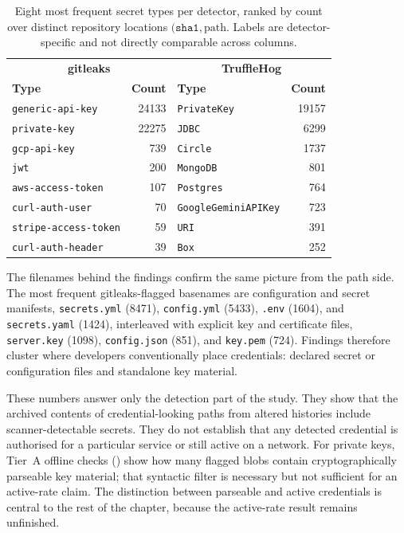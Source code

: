 \begin{table}[b]
\centering
\caption{Eight most frequent secret types per detector, ranked by count over distinct repository locations \((\texttt{sha1}, \text{path}\). Labels are detector-specific and not directly comparable across columns.}
\label{tab:sec-secret-types}
\small
\begin{tabular}{lr@{\hskip 1.5cm}lr}
\hline
\multicolumn{2}{c}{\textbf{gitleaks}} & \multicolumn{2}{c}{\textbf{TruffleHog}} \\
\textbf{Type} & \textbf{Count} & \textbf{Type} & \textbf{Count} \\
\hline
\texttt{generic-api-key}     & \num{24133} & \texttt{PrivateKey}         & \num{19157} \\
\texttt{private-key}         & \num{22275} & \texttt{JDBC}               & \num{6299}  \\
\texttt{gcp-api-key}         & \num{739}   & \texttt{Circle}             & \num{1737}  \\
\texttt{jwt}                 & \num{200}   & \texttt{MongoDB}            & \num{801}   \\
\texttt{aws-access-token}    & \num{107}   & \texttt{Postgres}           & \num{764}   \\
\texttt{curl-auth-user}      & \num{70}    & \texttt{GoogleGeminiAPIKey} & \num{723}   \\
\texttt{stripe-access-token} & \num{59}    & \texttt{URI}                & \num{391}   \\
\texttt{curl-auth-header}    & \num{39}    & \texttt{Box}                & \num{252}   \\
\hline
\end{tabular}
\end{table}

The filenames behind the findings confirm the same picture from the path side.
The most frequent gitleaks-flagged basenames are configuration and secret manifests, \texttt{secrets.yml} (\num{8471}), \texttt{config.yml} (\num{5433}), \texttt{.env} (\num{1604}), and \texttt{secrets.yaml} (\num{1424}), interleaved with explicit key and certificate files, \texttt{server.key} (\num{1098}), \texttt{config.json} (\num{851}), and \texttt{key.pem} (\num{724}).
Findings therefore cluster where developers conventionally place credentials: declared secret or configuration files and standalone key material.

These numbers answer only the detection part of the study.
They show that the archived contents of credential-looking paths from altered histories include scanner-detectable secrets.
They do not establish that any detected credential is authorised for a particular service or still active on a network.
For private keys, Tier~A offline checks () show how many flagged blobs contain cryptographically parseable key material; that syntactic filter is necessary but not sufficient for an active-rate claim.
The distinction between parseable and active credentials is central to the rest of the chapter, because the active-rate result remains unfinished.

